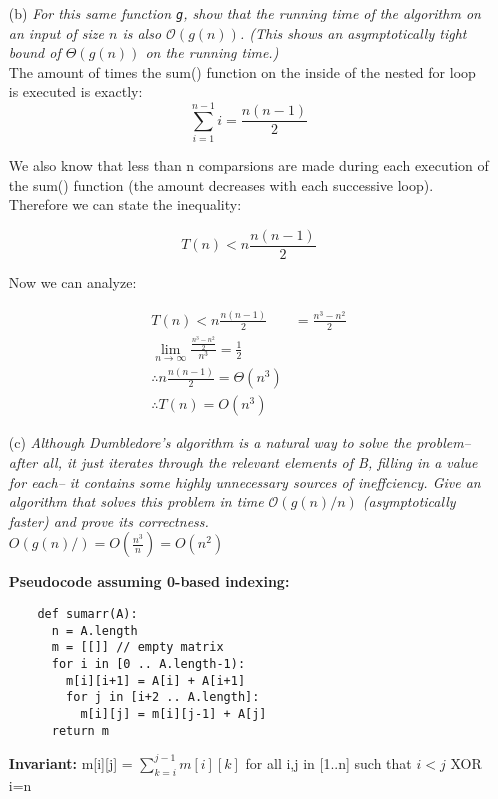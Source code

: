 \documentclass[12pt]{article} \setlength{\oddsidemargin}{0in}
\newcommand\lmni{\lim_{n\to\infty}}
\begin{document}
{\begin{enumerate}
\item[(b)]{\textit{For this same function \texttt{g}, show that the running
    time of the algorithm on an input of size $n$ is also
    $\mathcal{O}(g(n))$. (This shows an asymptotically tight bound of
    $\Theta(g(n))$ on the running time.)}} \\

    The amount of times the sum() function on the inside of the nested for loop is executed is exactly: 
    $$\sum_{i=1}^{n-1} i = \frac{n(n-1)}{2}$$ 

    We also know that less than n comparsions are made during each execution of the sum() function (the amount decreases with each successive loop). \\

    Therefore we can state the inequality:

    $$ T(n) < n\frac{n(n-1)}{2} $$

    Now we can analyze:

    \begin{align}
    T(n) < n\frac{n(n-1)}{2} &= \frac{n^3 - n^2}{2} \\
    \lmni \frac{\frac{n^3 - n^2}{2}}{n^3} = \frac{1}{2} \\
    \therefore n\frac{n(n-1)}{2} = \Theta(n^3) \\
    \therefore T(n) = O(n^3)
    \end{align}

    \newpage

\item[(c)]{\textit{Although Dumbledore's algorithm is a natural way to solve
    the problem--after all, it just iterates through the relevant
    elements of B, filling in a value for each-- it contains some
    highly unnecessary sources of ineffciency. Give an algorithm that
    solves this problem in time $\mathcal{O}(g(n)/n)$ (asymptotically
    faster) and prove its correctness.}}\\

    $O(g(n)/) = O(\frac{n^3}{n}) = O(n^2)$

    \textbf{Pseudocode assuming 0-based indexing:}
    \begin{verbatim}
    def sumarr(A):
      n = A.length
      m = [[]] // empty matrix
      for i in [0 .. A.length-1):
        m[i][i+1] = A[i] + A[i+1]
        for j in [i+2 .. A.length]:
          m[i][j] = m[i][j-1] + A[j]
      return m
    \end{verbatim}

    \textbf{Invariant:} m[i][j] = $\sum_{k=i}^{j-1} m[i][k]$ for all i,j in [1..n] such that $i < j$ XOR i=n


\end{enumerate}}
\end{document}
